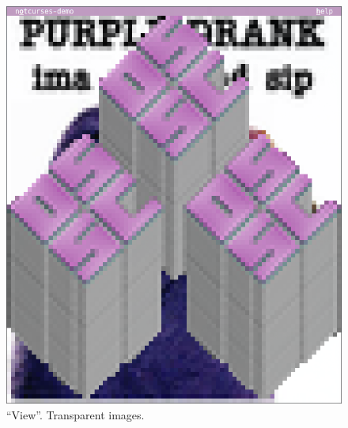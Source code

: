 \documentclass[letterpaper,10pt]{article}
\begin{document}
\begin{figure}
\begin{minipage}{0.45\textwidth}
    \includegraphics[width=1\linewidth]{media/demo-img2.png}
    \caption{``View''. Transparent images.}
  \end{minipage}\hfill
\end{figure}
\end{document}
